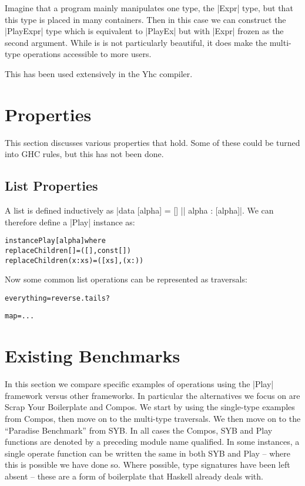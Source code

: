 \documentclass[preprint]{sigplanconf}
\newenvironment{code}{\begin{alltt}\small}{\end{alltt}}
\begin{document}
Imagine that a program mainly manipulates one type, the |Expr| type, but that this type is placed in many containers. Then in this case we can construct the |PlayExpr| type which is equivalent to |PlayEx| but with |Expr| frozen as the second argument. While is is not particularly beautiful, it does make the multi-type operations accessible to more users.

This has been used extensively in the Yhc compiler.

\section{Properties}

This section discusses various properties that hold. Some of these could be turned into GHC rules, but this has not been done.

\subsection{List Properties}

A list is defined inductively as |data [alpha] = [] || alpha : [alpha]|. We can therefore define a |Play| instance as:

\begin{code}
instance Play [alpha] where
    replaceChildren []     = ([]  , const [])
    replaceChildren (x:xs) = ([xs], (x:)    )
\end{code}

Now some common list operations can be represented as traversals:

\begin{code}
everything = reverse . tails ?
\end{code}

\begin{code}
map = ...
\end{code}


\section{Existing Benchmarks}

In this section we compare specific examples of operations using the |Play| framework versus other frameworks. In particular the alternatives we focus on are Scrap Your Boilerplate and Compos. We start by using the single-type examples from Compos, then move on to the multi-type traversals. We then move on to the ``Paradise Benchmark'' from SYB. In all cases the Compos, SYB and Play functions are denoted by a preceding module name qualified. In some instances, a single operate function can be written the same in both SYB and Play -- where this is possible we have done so. Where possible, type signatures have been left absent -- these are a form of boilerplate that Haskell already deals with.
\end{document}
